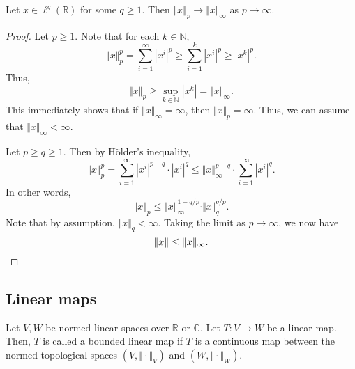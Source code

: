 \documentclass[11pt]{article}
\newcommand{\C}{\mathbb{C}}
\newcommand{\R}{\mathbb{R}}
\newcommand{\N}{\mathbb{N}}
\newcommand{\norm}[1]{\Vert #1 \Vert}
\theoremstyle{definition}
\theoremstyle{remark}
\begin{document}
    \begin{lemma}
        Let $x \in \ell^q(\R)$ for some $q \geq 1$. Then $\norm{x}_p \to
        \norm{x}_\infty$ as $p \to \infty$.
    \end{lemma}
    \begin{proof}
        Let $p \geq 1$. Note that for each $k \in \N$, \[
            \norm{x}_p^p = \sum_{i = 1}^\infty |x^i|^p \geq \sum_{i = 1}^k |x^i|^p
            \geq |x^k|^p.
        \] Thus, \[
            \norm{x}_p \geq \sup_{k \in \N} |x^k| = \norm{x}_\infty.
        \] This immediately shows that if $\norm{x}_\infty = \infty$, then
        $\norm{x}_p = \infty$. Thus, we can assume that $\norm{x}_\infty < \infty$.

        Let $p \geq q \geq 1$. Then by H\"older's inequality, \[
            \norm{x}_p^p = \sum_{i = 1}^\infty |x^i|^{p - q}\cdot |x^i|^q \leq
            \norm{x}_{\infty}^{p - q}\cdot \sum_{i = 1}^\infty |x^i|^q.
        \] In other words, \[
            \norm{x}_p \leq \norm{x}_\infty^{1 - q / p}\cdot \norm{x}_q^{q / p}.
        \] Note that by assumption, $\norm{x}_q < \infty$. Taking the limit as $p \to
        \infty$, we now have \[
            \norm{x} \leq \norm{x}_\infty. \qedhere
        \]
    \end{proof}


    \subsection{Linear maps}

    \begin{definition}
        Let $V, W$ be normed linear spaces over $\R$ or $\C$. Let $T\colon V \to W$
        be a linear map. Then, $T$ is called a bounded linear map if $T$ is a
        continuous map between the normed topological spaces $(V, \norm{\cdot}_V)$
        and $(W, \norm{\cdot}_W)$.
    \end{definition}
\end{document}
